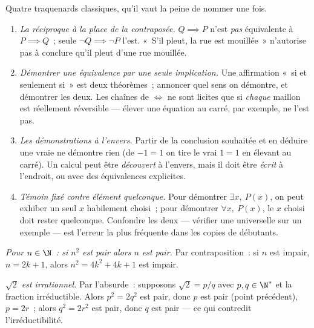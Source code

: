 \begin{remark}\label{rem:b1:logic:pitfalls}
Quatre traquenards classiques, qu'il vaut la peine de nommer une fois.
\begin{enumerate}
  \item \emph{La réciproque à la place de la contraposée.} $Q \implies
        P$ n'est \emph{pas} équivalente à $P \implies Q$~; seule
        $\lnot Q \implies \lnot P$ l'est. «~S'il pleut, la rue est
        mouillée~» n'autorise pas à conclure qu'il pleut d'une rue
        mouillée.
  \item \emph{Démontrer une équivalence par une seule implication.} Une
        affirmation «~si et seulement si~» est deux théorèmes~;
        annoncer quel sens on démontre, et démontrer les deux. Les
        chaînes de $\iff$ ne sont licites que si \emph{chaque} maillon
        est réellement réversible --- élever une équation au carré, par
        exemple, ne l'est pas.
  \item \emph{Les démonstrations à l'envers.} Partir de la conclusion
        souhaitée et en déduire une  vraie ne démontre rien
        (de $-1 = 1$ on tire le vrai $1 = 1$ en élevant au carré). Un
        calcul peut être \emph{découvert} à l'envers, mais il doit être
        \emph{écrit} à l'endroit, ou avec des équivalences explicites.
  \item \emph{Témoin fixé contre élément quelconque.} Pour démontrer
        $\exists x,\ P(x)$, on peut exhiber un seul $x$ habilement
        choisi~; pour démontrer $\forall x,\ P(x)$, le $x$ choisi doit
        rester quelconque. Confondre les deux --- vérifier une
         universelle sur un exemple --- est l'erreur la plus
        fréquente dans les copies de débutants.
\end{enumerate}
\end{remark}

\begin{example}\label{ex:b1:logic:sqrt2}
\emph{Pour $n \in \N$~: si $n^2$ est pair alors $n$ est pair.} Par
contraposition~: si $n$ est impair, $n = 2k+1$, alors
$n^2 = 4k^2 + 4k + 1$ est impair.

\emph{$\sqrt 2$ est irrationnel.} Par l'absurde~: supposons
$\sqrt 2 = p/q$ avec $p, q \in \N^*$ et la fraction irréductible.
Alors $p^2 = 2q^2$ est pair, donc $p$ est pair (point précédent),
$p = 2r$~; alors $q^2 = 2r^2$ est pair, donc $q$ est pair --- ce qui
contredit l'irréductibilité.
\end{example}

